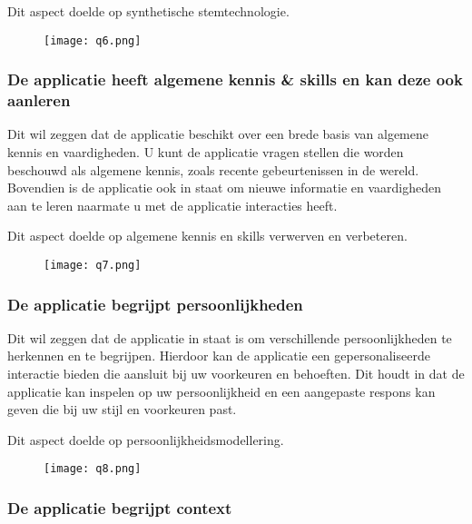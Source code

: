 Dit aspect doelde op synthetische stemtechnologie.

\begin{figure}[htbp]
    \centering
    \texttt{[image: q6.png]}
    \label{fig:vraag_6_resultaat}
\end{figure}

\subsubsection{De applicatie heeft algemene kennis \& skills en kan deze ook aanleren}

Dit wil zeggen dat de applicatie beschikt over een brede basis van algemene kennis en vaardigheden. U kunt de applicatie vragen stellen die worden beschouwd als algemene kennis, zoals recente gebeurtenissen in de wereld. Bovendien is de applicatie ook in staat om nieuwe informatie en vaardigheden aan te leren naarmate u met de applicatie interacties heeft.

Dit aspect doelde op algemene kennis en skills verwerven en verbeteren.

\begin{figure}[htbp]
    \centering
    \texttt{[image: q7.png]}
    \label{fig:vraag_7_resultaat}
\end{figure}

\subsubsection{De applicatie begrijpt persoonlijkheden}

Dit wil zeggen dat de applicatie in staat is om verschillende persoonlijkheden te herkennen en te begrijpen. Hierdoor kan de applicatie een gepersonaliseerde interactie bieden die aansluit bij uw voorkeuren en behoeften. Dit houdt in dat de applicatie kan inspelen op uw persoonlijkheid en een aangepaste respons kan geven die bij uw stijl en voorkeuren past.

Dit aspect doelde op persoonlijkheidsmodellering.

\begin{figure}[htbp]
    \centering
    \texttt{[image: q8.png]}
    \label{fig:vraag_8_resultaat}
\end{figure}

\subsubsection{De applicatie begrijpt context}

